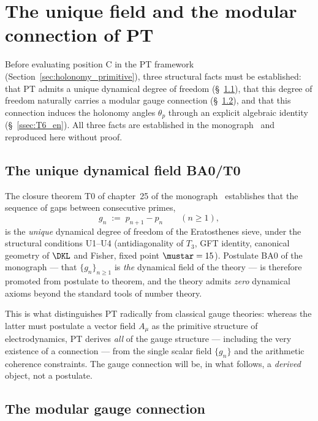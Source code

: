 \section{The unique field and the modular connection of PT}
\label{sec:field_connection}

Before evaluating position C in the PT framework
(Section~\ref{sec:holonomy_primitive}), three structural facts
must be established: that PT admits a unique dynamical degree of
freedom (\S~\ref{ssec:BA0_en}), that this degree of freedom
naturally carries a modular gauge connection
(\S~\ref{ssec:gauge_connection_en}), and that this connection
induces the holonomy angles $\theta_p$ through an explicit
algebraic identity (\S~\ref{ssec:T6_en}). All three facts are
established in the monograph~\cite{PT_Monograph} and reproduced
here without proof.

\subsection{The unique dynamical field BA0/T0}
\label{ssec:BA0_en}

The closure theorem T0 of chapter~25 of the
monograph~\cite{PT_Monograph} establishes that the sequence of
gaps between consecutive primes,
\begin{equation}
  g_n \;:=\; p_{n+1} - p_n \qquad (n \geq 1),
  \label{eq:g_n_def_en}
\end{equation}
is the \emph{unique} dynamical degree of freedom of the
Eratosthenes sieve, under the structural conditions U1--U4
(antidiagonality of $T_3$, GFT identity, canonical geometry of
$\DKL$ and Fisher, fixed point $\mustar = 15$). Postulate BA0 of
the monograph --- that $\{g_n\}_{n \geq 1}$ is \emph{the}
dynamical field of the theory --- is therefore promoted from
postulate to theorem, and the theory admits \emph{zero} dynamical
axioms beyond the standard tools of number theory.

This is what distinguishes PT radically from classical gauge
theories: whereas the latter must postulate a vector field $A_\mu$
as the primitive structure of electrodynamics, PT derives
\emph{all} of the gauge structure --- including the very
existence of a connection --- from the single scalar field
$\{g_n\}$ and the arithmetic coherence constraints. The gauge
connection will be, in what follows, a \emph{derived} object, not
a postulate.

\subsection{The modular gauge connection}
\label{ssec:gauge_connection_en}

